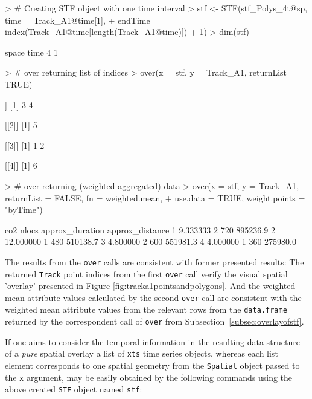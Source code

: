 \documentclass[12pt, oneside, a4paper]{scrbook}
\let\code=\texttt
\begin{document}
\begin{small}
\begin{Schunk}
\begin{Sinput}
> # Creating STF object with one time interval
> stf <- STF(stf_Polys_4t@sp, time = Track_A1@time[1], 
+            endTime = index(Track_A1@time[length(Track_A1@time)]) + 1)
> dim(stf)
\end{Sinput}
\begin{Soutput}
space  time 
    4     1 
\end{Soutput}
\begin{Sinput}
> # over returning list of indices
> over(x = stf, y = Track_A1, returnList = TRUE)
\end{Sinput}
\begin{Soutput}
[[1]]
[1] 3 4

[[2]]
[1] 5

[[3]]
[1] 1 2

[[4]]
[1] 6
\end{Soutput}
\begin{Sinput}
> # over returning (weighted aggregated) data
> over(x = stf, y = Track_A1, returnList = FALSE, fn = weighted.mean, 
+      use.data = TRUE, weight.points = "byTime")
\end{Sinput}
\begin{Soutput}
        co2 nlocs approx_duration approx_distance
1  9.333333     2             720        895236.9
2 12.000000     1             480        510138.7
3  4.800000     2             600        551981.3
4  4.000000     1             360        275980.0
\end{Soutput}
\end{Schunk}
\end{small}

The results from the \code{over} calls are consistent with former presented results:
The returned \code{Track} point indices from the first \code{over} call verify the visual spatial 'overlay' presented in Figure \ref{fig:tracka1pointsandpolygons}. 
And the weighted mean attribute values calculated by the second \code{over} call are consistent with the weighted mean attribute values from the relevant rows from the \code{data.frame} returned by the correspondent call of \code{over} from Subsection~\ref{subsec:overlayofstf}.
\par\medskip
If one aims to consider the temporal information in the resulting data structure of a \textit{pure} spatial overlay a list of \code{xts} time series objects, whereas each list element corresponds to one spatial geometry from the \code{Spatial} object passed to the \code{x} argument, may be easily obtained by the following commands using the above created \code{STF} object named \code{stf}:
\end{document}
